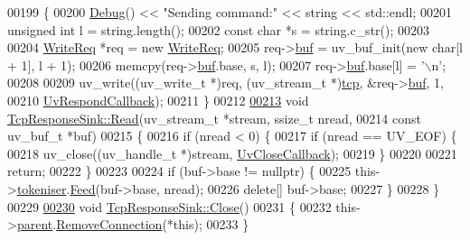 \begin{DoxyCode}
00199 \textcolor{keyword}{}\{
00200     \hyperlink{classDebug}{Debug}() << \textcolor{stringliteral}{"Sending command:"} << \textcolor{keywordtype}{string} << std::endl;
00201     \textcolor{keywordtype}{unsigned} \textcolor{keywordtype}{int} l = \textcolor{keywordtype}{string}.length();
00202     \textcolor{keyword}{const} \textcolor{keywordtype}{char} *s = \textcolor{keywordtype}{string}.c\_str();
00203 
00204     \hyperlink{structWriteReq}{WriteReq} *req = \textcolor{keyword}{new} \hyperlink{structWriteReq}{WriteReq};
00205     req->\hyperlink{structWriteReq_a2e611e010ab154c56c8055dee140b6b5}{buf} = uv\_buf\_init(\textcolor{keyword}{new} \textcolor{keywordtype}{char}[l + 1], l + 1);
00206     memcpy(req->\hyperlink{structWriteReq_a2e611e010ab154c56c8055dee140b6b5}{buf}.base, s, l);
00207     req->\hyperlink{structWriteReq_a2e611e010ab154c56c8055dee140b6b5}{buf}.base[l] = \textcolor{charliteral}{'\(\backslash\)n'};
00208 
00209     uv\_write((uv\_write\_t *)req, (uv\_stream\_t *)\hyperlink{classTcpResponseSink_afa43e15736053cef76fbf27bdc3197a9}{tcp}, &req->\hyperlink{structWriteReq_a2e611e010ab154c56c8055dee140b6b5}{buf}, 1,
00210              \hyperlink{io__reactor_8cpp_af58ed397c8d93bffdc01b621d4abaa8c}{UvRespondCallback});
00211 \}
00212 
\hypertarget{io__reactor_8cpp_source_l00213}{}\hyperlink{classTcpResponseSink_a9ee277599dbd6cfc5853a9145f21694b}{00213} \textcolor{keywordtype}{void} \hyperlink{classTcpResponseSink_a9ee277599dbd6cfc5853a9145f21694b}{TcpResponseSink::Read}(uv\_stream\_t *stream, ssize\_t nread,
00214                            \textcolor{keyword}{const} uv\_buf\_t *buf)
00215 \{
00216     \textcolor{keywordflow}{if} (nread < 0) \{
00217         \textcolor{keywordflow}{if} (nread == UV\_EOF) \{
00218             uv\_close((uv\_handle\_t *)stream, \hyperlink{io__reactor_8cpp_ab85791c3e9c737453047decfbb7388f4}{UvCloseCallback});
00219         \}
00220 
00221         \textcolor{keywordflow}{return};
00222     \}
00223 
00224     \textcolor{keywordflow}{if} (buf->base != \textcolor{keyword}{nullptr}) \{
00225         this->\hyperlink{classTcpResponseSink_ab289c592752e4c1fdc7d38cc9d6c2aab}{tokeniser}.\hyperlink{classTokeniser_ab4b8f1238c89d766a1d72f0ee619406d}{Feed}(buf->base, nread);
00226         \textcolor{keyword}{delete}[] buf->base;
00227     \}
00228 \}
00229 
\hypertarget{io__reactor_8cpp_source_l00230}{}\hyperlink{classTcpResponseSink_a2e40c526177918ade20bec1e4f66698a}{00230} \textcolor{keywordtype}{void} \hyperlink{classTcpResponseSink_a2e40c526177918ade20bec1e4f66698a}{TcpResponseSink::Close}()
00231 \{
00232     this->\hyperlink{classTcpResponseSink_a190e607290f6ba6b3655c99e44a5e56e}{parent}.\hyperlink{classIoReactor_af31bb722acf08d10eaa46ea7a1a5d4ca}{RemoveConnection}(*\textcolor{keyword}{this});
00233 \}
\end{DoxyCode}
